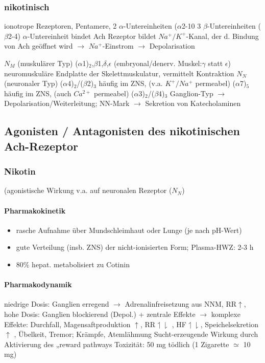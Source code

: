 \documentclass[10pt,a4paper]{report}
\begin{document}
\subsubsection{nikotinisch}	
ionotrope Rezeptoren, Pentamere, 
2 $\alpha$-Untereinheiten ($\alpha$2-10
3 $\beta$-Untereinheiten ($\beta$2-4)
$\alpha$-Untereinheit bindet Ach
Rezeptor bildet $Na^+/K^+$-Kanal, 
der d. Bindung von Ach geöffnet wird 
$\rightarrow$ $Na^+$-Einstrom $\rightarrow$ Depolarisation 
 
$N_M$ 	(muskulärer Typ)
($\alpha$1)$_2$,$\beta$1,$\delta$,$\epsilon$ (embryonal/denerv. Muskel:$\gamma$ statt $\epsilon$)
neuromuskuläre Endplatte der Skelettmuskulatur, vermittelt Kontraktion	
$N_N$ 	(neuronaler Typ)
($\alpha$4)$_2$/($\beta$2)$_3$ 	häufig im ZNS, (v.a. $K^+/Na^+$ permeabel)
($\alpha$7)$_5$ 	häufig im ZNS, (auch $Ca^{2+}$ permeabel)
($\alpha$3)$_2$/($\beta$4)$_3$ Ganglion-Typ $\rightarrow$ Depolarisation/Weiterleitung; 
NN-Mark $\rightarrow$ Sekretion von Katecholaminen
\subsection{Agonisten / Antagonisten des nikotinischen Ach-Rezeptor}
\subsubsection{Nikotin}(agonistische Wirkung v.a. auf neuronalen Rezeptor ($N_N$) \\
\paragraph{Pharmakokinetik}
\begin{itemize}
	\item rasche Aufnahme über Mundschleimhaut oder Lunge (je nach pH-Wert)
    \item gute Verteilung (insb. ZNS) der nicht-ionisierten Form; Plasma-HWZ: 2-3 h
    \item 80\% hepat. metabolisiert zu Cotinin
\end{itemize}
\paragraph{Pharmakodynamik}
 niedrige Dosis: Ganglien  erregend $\rightarrow$ Adrenalinfreisetzung aus NNM, RR$\uparrow$, hohe Dosis: Ganglien blockierend (Depol.) + zentrale Effekte
$\rightarrow$ komplexe Effekte: Durchfall, Magensaftproduktion $\uparrow$, RR$	\upharpoonleft\downharpoonright$ , HF$	\upharpoonleft\downharpoonright$, Speichelsekretion $\uparrow$ , Übelkeit, Tremor; Krämpfe, Atemlähmung Sucht-erzeugende Wirkung durch Aktivierung des „reward pathways Toxizität: 50 mg tödlich (1 Zigarette $\simeq$ 10 mg)
\end{document}
